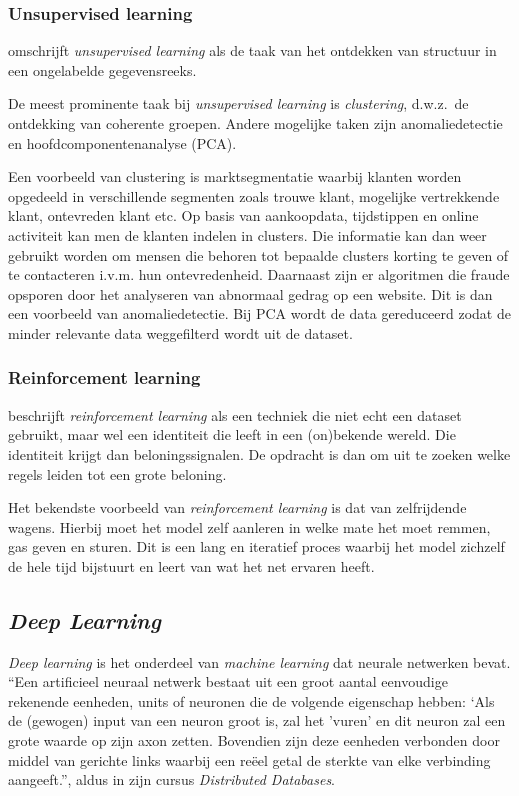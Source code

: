 {\subsubsection{Unsupervised learning}
\textcite{Lievens2021} omschrijft \textit{unsupervised learning} als de taak van het ontdekken van structuur in een ongelabelde gegevensreeks.

De meest prominente taak bij \textit{unsupervised learning} is \textit{clustering}, d.w.z.\ de ontdekking van coherente groepen. Andere mogelijke taken zijn anomaliedetectie en hoofdcomponentenanalyse (PCA).

Een voorbeeld van clustering is marktsegmentatie waarbij klanten worden opgedeeld in verschillende segmenten zoals trouwe klant, mogelijke vertrekkende klant, ontevreden klant etc. Op basis van aankoopdata, tijdstippen en online activiteit kan men de klanten indelen in clusters. Die informatie kan dan weer gebruikt worden om mensen die behoren tot bepaalde clusters korting te geven of te contacteren i.v.m. hun ontevredenheid.
Daarnaast zijn er algoritmen die fraude opsporen door het analyseren van abnormaal gedrag op een website. Dit is dan een voorbeeld van anomaliedetectie.
Bij PCA wordt de data gereduceerd zodat de minder relevante data weggefilterd wordt uit de dataset.

\subsubsection{Reinforcement learning}
\textcite{Lievens2021} beschrijft \textit{reinforcement learning} als een techniek die niet echt een dataset gebruikt, maar wel een identiteit die leeft in een (on)bekende wereld. Die identiteit krijgt dan beloningssignalen. De opdracht is dan om uit te zoeken welke regels leiden tot een grote beloning.

Het bekendste voorbeeld van \textit{reinforcement learning} is dat van zelfrijdende wagens. Hierbij moet het model zelf aanleren in welke mate het moet remmen, gas geven en sturen. Dit is een lang en iteratief proces waarbij het model zichzelf de hele tijd bijstuurt en leert van wat het net ervaren heeft.

\subsection{\textit{Deep Learning}}
\textit{Deep learning} is het onderdeel van \textit{machine learning} dat neurale netwerken bevat.
``Een artificieel neuraal netwerk bestaat uit een groot aantal eenvoudige rekenende eenheden, units of neuronen die de volgende eigenschap hebben: `Als de (gewogen) input van een neuron groot is, zal het 'vuren' en dit neuron zal een grote waarde op zijn axon zetten. Bovendien zijn deze eenheden verbonden door middel van gerichte links waarbij een reëel getal de sterkte van elke verbinding aangeeft.'', aldus \textcite{Lievens2021} in zijn cursus \textit{Distributed Databases}.

}

